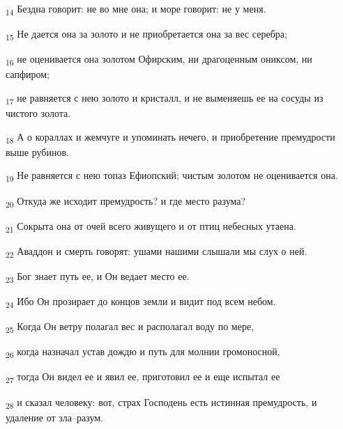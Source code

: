 \begin{tcolorbox}
\textsubscript{14} Бездна говорит: не во мне она; и море говорит: не у меня.
\end{tcolorbox}
\begin{tcolorbox}
\textsubscript{15} Не дается она за золото и не приобретается она за вес серебра;
\end{tcolorbox}
\begin{tcolorbox}
\textsubscript{16} не оценивается она золотом Офирским, ни драгоценным ониксом, ни сапфиром;
\end{tcolorbox}
\begin{tcolorbox}
\textsubscript{17} не равняется с нею золото и кристалл, и не выменяешь ее на сосуды из чистого золота.
\end{tcolorbox}
\begin{tcolorbox}
\textsubscript{18} А о кораллах и жемчуге и упоминать нечего, и приобретение премудрости выше рубинов.
\end{tcolorbox}
\begin{tcolorbox}
\textsubscript{19} Не равняется с нею топаз Ефиопский; чистым золотом не оценивается она.
\end{tcolorbox}
\begin{tcolorbox}
\textsubscript{20} Откуда же исходит премудрость? и где место разума?
\end{tcolorbox}
\begin{tcolorbox}
\textsubscript{21} Сокрыта она от очей всего живущего и от птиц небесных утаена.
\end{tcolorbox}
\begin{tcolorbox}
\textsubscript{22} Аваддон и смерть говорят: ушами нашими слышали мы слух о ней.
\end{tcolorbox}
\begin{tcolorbox}
\textsubscript{23} Бог знает путь ее, и Он ведает место ее.
\end{tcolorbox}
\begin{tcolorbox}
\textsubscript{24} Ибо Он прозирает до концов земли и видит под всем небом.
\end{tcolorbox}
\begin{tcolorbox}
\textsubscript{25} Когда Он ветру полагал вес и располагал воду по мере,
\end{tcolorbox}
\begin{tcolorbox}
\textsubscript{26} когда назначал устав дождю и путь для молнии громоносной,
\end{tcolorbox}
\begin{tcolorbox}
\textsubscript{27} тогда Он видел ее и явил ее, приготовил ее и еще испытал ее
\end{tcolorbox}
\begin{tcolorbox}
\textsubscript{28} и сказал человеку: вот, страх Господень есть истинная премудрость, и удаление от зла--разум.
\end{tcolorbox}
